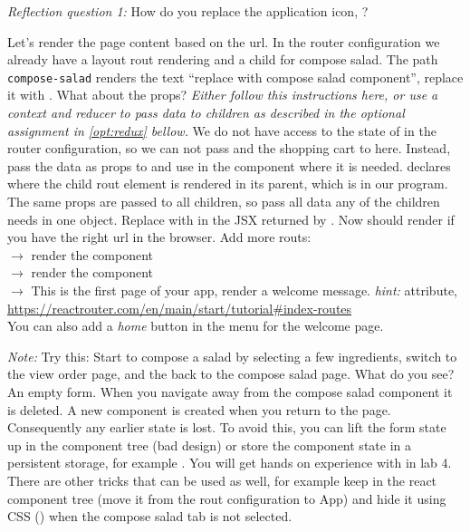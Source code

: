 \documentclass[fleqn, article, a4paper]{memoir}
\begin{document}
\begin{Assignments}
\noindent \emph{Reflection question 1:} How do you replace the application icon, ?


\item Let's render the page content based on the url. In the router configuration we already have a layout rout rendering  and a child for compose salad. The path \texttt{compose-salad} renders the text ``replace with compose salad component'', replace it with . What about the props? \emph{Either follow this instructions here, or use a context and reducer to pass data to children as described in the optional assignment in \ref{opt:redux} bellow.} We do not have access to the state of  in the router configuration, so we can not pass  and the shopping cart to  here. Instead, pass the data as props to  and use  in the component where it is needed.  declares where the child rout element is rendered in its parent, which is  in our program. The same props are passed to all children, so pass all data any of the children needs in one object. Replace  with  in the JSX returned by . Now  should render if you have the right url in the browser. Add more routs:
\\  $\rightarrow$ render the  component
\\  $\rightarrow$ render the  component
\\  $\rightarrow$ This is the first page of your app, render a welcome message. \emph{hint:}  attribute, \url{https://reactrouter.com/en/main/start/tutorial#index-routes}
\\You can also add a \emph{home} button in the menu for the welcome page.

\emph{Note:} Try this: Start to compose a salad by selecting a few ingredients, switch to the view order page, and the back to the compose salad page. What do you see? An empty form. When you navigate away from the compose salad component it is deleted. A new component is created when you return to the page. Consequently any earlier state is lost. To avoid this, you can lift the form state up in the component tree (bad design) or store the component state in a persistent storage, for example . You will get hands on experience with  in lab 4. There are other tricks that can be used as well, for example keep  in the react component tree (move it from the rout configuration to App) and hide it using CSS () when the compose salad tab is not selected.


\end{Assignments}
\end{document}
